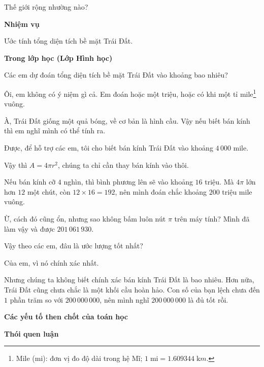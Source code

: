   {Thế giới rộng nhường nào?}
  {
    \textbf{Nhiệm vụ}

    Ước tính tổng diện tích bề mặt Trái Đất.

    \textbf{Trong lớp học (Lớp Hình học)}

    \begin{scriptlist}
    \item [Giáo viên:] Các em dự đoán tổng diện tích bề mặt Trái Đất vào khoảng bao nhiêu?

    \item [Học sinh 1:] Ôi, em không có ý niệm gì cả. Em đoán hoặc một triệu, hoặc có khi một tỉ mile\footnote{Mile (mi): đơn vị đo độ dài trong hệ Mĩ; $1\;\text{mi}= 1.609344\;\text{k}m$.} vuông.

    \item [Học sinh 2:] À, Trái Đất giống một quả bóng, về cơ bản là hình cầu. Vậy nếu biết bán kính thì em nghĩ mình có thể tính ra.

    \item [Giáo viên:] Được, để hỗ trợ các em, tôi cho biết bán kính Trái Đất vào khoảng $4\,000$ mile.

    \item [Học sinh 2:] Vậy thì $A = 4\pi r^2$, chúng ta chỉ cần thay bán kính vào thôi.

    \item [Học sinh 3:] Nếu bán kính cỡ $4$ nghìn, thì bình phương lên sẽ vào khoảng $16$ triệu. Mà $4\pi$ lớn hơn $12$ một chút, còn $12 \times 16 = 192$, nên mình đoán chắc khoảng $200$ triệu mile vuông.

    \item [Học sinh 4:] Ừ, cách đó cũng ổn, nhưng sao không bấm luôn nút $\pi$ trên máy tính? Mình đã làm vậy và được $201\,061\,930$.

    \item [Giáo viên:] Vậy theo các em, đâu là ước lượng tốt nhất?

    \item [Học sinh 4:] Của em, vì nó chính xác nhất.

    \item [Học sinh 3:] Nhưng chúng ta không biết chính xác bán kính Trái Đất là bao nhiêu. Hơn nữa, Trái Đất cũng chưa chắc là một khối cầu hoàn hảo. Con số của bạn lệch chưa đến $1$ phần trăm so với $200\,000\,000$, nên mình nghĩ $200\,000\,000$ là đủ tốt rồi.
    \end{scriptlist}

    \textbf{Các yếu tố then chốt của toán học}

    \begin{hanglist}
    \end{hanglist}\vspace{\baselineskip}

    \textbf{Thói quen luận}

    \begin{hanglist}
      
    \end{hanglist}
  }
